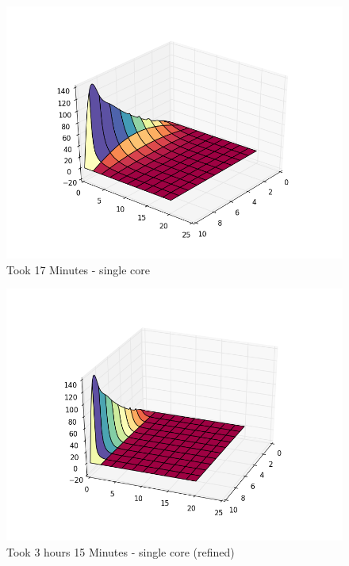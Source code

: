 \documentclass{sig-alternate}
\begin{document}
\begin{figure}[h!]
    \includegraphics[scale=.5]{hhheat1} 
    \caption{Took 17 Minutes - single core}
\end{figure}

\begin{figure}[h!]
   \includegraphics[scale=.5]{heat50} 
   \caption {Took 3 hours 15 Minutes - single core (refined)}
\end{figure}

\balance
\end{document}
